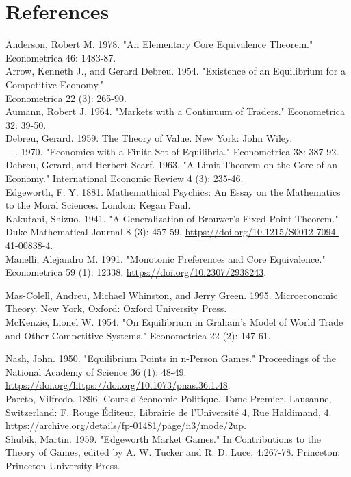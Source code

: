 \documentclass[10pt]{article}
\begin{document}
\section*{References}
Anderson, Robert M. 1978. "An Elementary Core Equivalence Theorem." Econometrica 46: 1483-87.\\
Arrow, Kenneth J., and Gerard Debreu. 1954. "Existence of an Equilibrium for a Competitive Economy."\\
Econometrica 22 (3): 265-90.\\
Aumann, Robert J. 1964. "Markets with a Continuum of Traders." Econometrica 32: 39-50.\\
Debreu, Gerard. 1959. The Theory of Value. New York: John Wiley.\\
---. 1970. "Economies with a Finite Set of Equilibria." Econometrica 38: 387-92.\\
Debreu, Gerard, and Herbert Scarf. 1963. "A Limit Theorem on the Core of an Economy." International Economic Review 4 (3): 235-46.\\
Edgeworth, F. Y. 1881. Mathemathical Psychics: An Essay on the Mathematics to the Moral Sciences. London: Kegan Paul.\\
Kakutani, Shizuo. 1941. "A Generalization of Brouwer's Fixed Point Theorem." Duke Mathematical Journal 8 (3): 457-59. \href{https://doi.org/10.1215/S0012-7094-41-00838-4}{https://doi.org/10.1215/S0012-7094-41-00838-4}.\\
Manelli, Alejandro M. 1991. "Monotonic Preferences and Core Equivalence." Econometrica 59 (1): 12338. \href{https://doi.org/10.2307/2938243}{https://doi.org/10.2307/2938243}.

Mas-Colell, Andreu, Michael Whinston, and Jerry Green. 1995. Microeconomic Theory. New York, Oxford: Oxford University Press.\\
McKenzie, Lionel W. 1954. "On Equilibrium in Graham's Model of World Trade and Other Competitive Systems." Econometrica 22 (2): 147-61.

Nash, John. 1950. "Equilibrium Points in n-Person Games." Proceedings of the National Academy of Science 36 (1): 48-49. \href{https://doi.org/https://doi.org/10.1073/pnas.36.1.48}{https://doi.org/https://doi.org/10.1073/pnas.36.1.48}.\\
Pareto, Vilfredo. 1896. Cours d'économie Politique. Tome Premier. Lausanne, Switzerland: F. Rouge Éditeur, Librairie de l’Université 4, Rue Haldimand, 4. \href{https://archive.org/details/fp-01481/page/n3/mode/2up}{https://archive.org/details/fp-01481/page/n3/mode/2up}.\\
Shubik, Martin. 1959. "Edgeworth Market Games." In Contributions to the Theory of Games, edited by A. W. Tucker and R. D. Luce, 4:267-78. Princeton: Princeton University Press.
\end{document}

